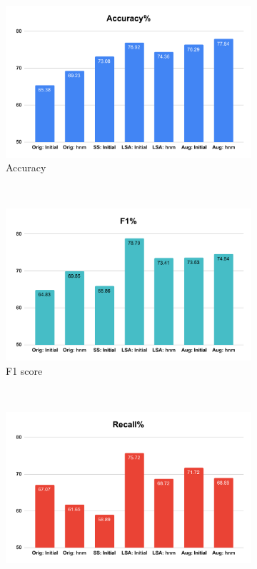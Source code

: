 \begin{figure}[!htb]
     \begin{subfigure}[b]{0.5\linewidth}
         \centering
          \includegraphics[scale=0.35]{Figs/chap4/baseacc.pdf}
          \caption{Accuracy}
     \end{subfigure}
     ~
     \begin{subfigure}[b]{0.5\linewidth}
         \centering
          \includegraphics[scale=0.35]{Figs/chap4/basef.pdf}
          \caption{F1 score}
     \end{subfigure}
     \\
     \begin{subfigure}[b]{0.5\linewidth}
         \centering
          \includegraphics[scale=0.35]{Figs/chap4/baserec.pdf}

\end{subfigure}
\end{figure}
